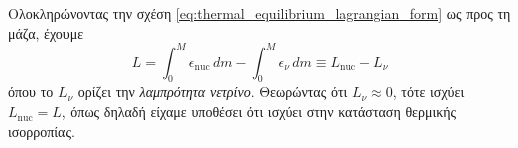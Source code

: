 Ολοκληρώνοντας την σχέση \eqref{eq:thermal_equilibrium_lagrangian_form} ως προς τη μάζα, έχουμε
\begin{equation}
    \label{eq:neutrino_luminosity}
    L = \int_{0}^{M} \epsilon_{\text{nuc}} \,dm - \int_{0}^{M} \epsilon_\nu \,dm \equiv L_{\text{nuc}} - L_\nu 
\end{equation}
όπου το $L_\nu$ ορίζει την \textit{λαμπρότητα νετρίνο}. Θεωρώντας ότι $L_\nu \approx 0$, τότε ισχύει $L_{\text{nuc}} = L$, όπως δηλαδή είχαμε υποθέσει ότι ισχύει στην κατάσταση θερμικής ισορροπίας.
